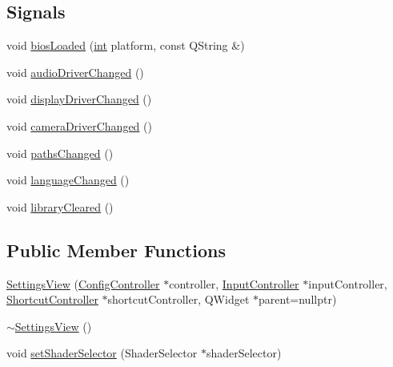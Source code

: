 \subsection*{Signals}
\begin{DoxyCompactItemize}
\item 
void \mbox{\hyperlink{class_q_g_b_a_1_1_settings_view_a970e1868f2c564fd80b5bc4b9364b208}{bios\+Loaded}} (\mbox{\hyperlink{ioapi_8h_a787fa3cf048117ba7123753c1e74fcd6}{int}} platform, const Q\+String \&)
\item 
void \mbox{\hyperlink{class_q_g_b_a_1_1_settings_view_af17733fea12d5dba72604c1a837cb7e9}{audio\+Driver\+Changed}} ()
\item 
void \mbox{\hyperlink{class_q_g_b_a_1_1_settings_view_a64badcb415f4f6b3e7d722aba2f43b3e}{display\+Driver\+Changed}} ()
\item 
void \mbox{\hyperlink{class_q_g_b_a_1_1_settings_view_a0d61f9caab6f460d7df59589bfb9e711}{camera\+Driver\+Changed}} ()
\item 
void \mbox{\hyperlink{class_q_g_b_a_1_1_settings_view_abae5daca6c49f303db87bd0b46f42528}{paths\+Changed}} ()
\item 
void \mbox{\hyperlink{class_q_g_b_a_1_1_settings_view_a3589dcd1617f1a8dc6512b3afe41e7aa}{language\+Changed}} ()
\item 
void \mbox{\hyperlink{class_q_g_b_a_1_1_settings_view_a8d85dfc8109c16b93ec7adae18f27da8}{library\+Cleared}} ()
\end{DoxyCompactItemize}
\subsection*{Public Member Functions}
\begin{DoxyCompactItemize}
\item 
\mbox{\hyperlink{class_q_g_b_a_1_1_settings_view_aab1ad8a93c4118a33534328f70ecb54f}{Settings\+View}} (\mbox{\hyperlink{class_q_g_b_a_1_1_config_controller}{Config\+Controller}} $\ast$controller, \mbox{\hyperlink{class_q_g_b_a_1_1_input_controller}{Input\+Controller}} $\ast$input\+Controller, \mbox{\hyperlink{class_q_g_b_a_1_1_shortcut_controller}{Shortcut\+Controller}} $\ast$shortcut\+Controller, Q\+Widget $\ast$parent=nullptr)
\item 
\mbox{\hyperlink{class_q_g_b_a_1_1_settings_view_a3287e7c87008472a93bbc10fe331b6c2}{$\sim$\+Settings\+View}} ()
\item 
void \mbox{\hyperlink{class_q_g_b_a_1_1_settings_view_a251334e02b23d94ba1248c827ac62986}{set\+Shader\+Selector}} (Shader\+Selector $\ast$shader\+Selector)
\end{DoxyCompactItemize}
